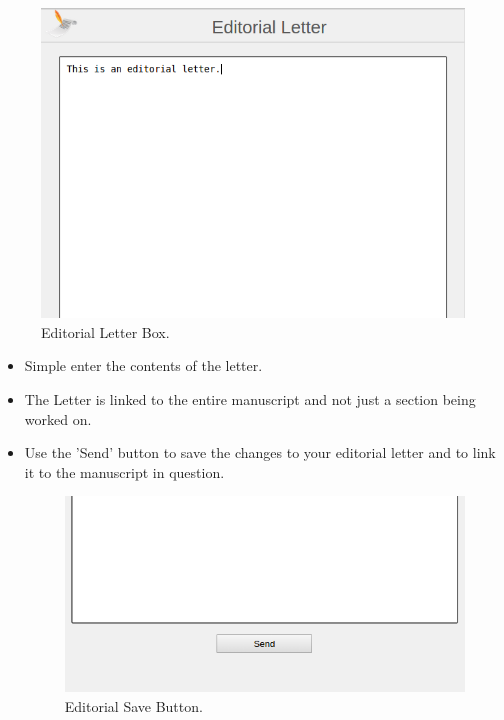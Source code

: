 \begin{figure}[h]
			\centering
			\includegraphics[scale=0.6]{images/EditorialLetter.png}
			\caption{Editorial Letter Box.}
		\end{figure} 
		
		\begin{itemize}
			\item Simple enter the contents of the letter.
			\item The Letter is linked to the entire manuscript and not just a section being worked on.
			\item Use the 'Send' button to save the changes to your editorial letter and to link it to the manuscript in question.
			
			\begin{figure}[h]
			\centering
			\includegraphics[scale=0.6]{images/SendEditorialLetter.png}
			\caption{Editorial Save Button.}
		\end{figure}  
		\end{itemize}